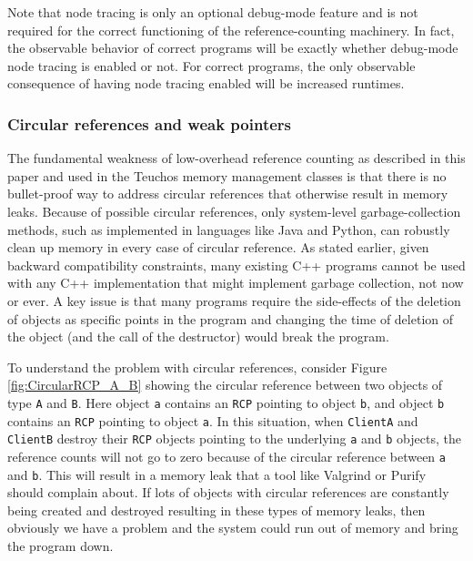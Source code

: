 \documentclass[pdf,ps2pdf,11pt]{SANDreport}
\begin{document}
Note that node tracing is only an optional debug-mode feature and is
not required for the correct functioning of the reference-counting
machinery.  In fact, the observable behavior of correct programs will
be exactly whether debug-mode node tracing is enabled or not.  For
correct programs, the only observable consequence of having node
tracing enabled will be increased runtimes.


%
{}\subsubsection{Circular references and weak pointers}
\label{sec:circular-references-weak-pointers}
%

The fundamental weakness of low-overhead reference counting as
described in this paper and used in the Teuchos memory management
classes is that there is no bullet-proof way to address circular
references that otherwise result in memory leaks.  Because of possible
circular references, only system-level garbage-collection methods,
such as implemented in languages like Java and Python, can robustly
clean up memory in every case of circular reference.  As stated
earlier, given backward compatibility constraints, many existing C++
programs cannot be used with any C++ implementation that might
implement garbage collection, not now or ever.  A key issue is that
many programs require the side-effects of the deletion of objects as
specific points in the program and changing the time of deletion of
the object (and the call of the destructor) would break the program.

To understand the problem with circular references, consider Figure
{}\ref{fig:CircularRCP_A_B} showing the circular reference between two
objects of type {}\texttt{A} and {}\texttt{B}.  Here object
{}\texttt{a} contains an {}\texttt{RCP} pointing to object
{}\texttt{b}, and object {}\texttt{b} contains an {}\texttt{RCP}
pointing to object {}\texttt{a}.  In this situation, when
{}\texttt{ClientA} and {}\texttt{ClientB} destroy their {}\texttt{RCP}
objects pointing to the underlying {}\texttt{a} and {}\texttt{b}
objects, the reference counts will not go to zero because of the
circular reference between {}\texttt{a} and {}\texttt{b}.  This will
result in a memory leak that a tool like Valgrind or Purify should
complain about.  If lots of objects with circular references are
constantly being created and destroyed resulting in these types of
memory leaks, then obviously we have a problem and the system could
run out of memory and bring the program down.
\end{document}
